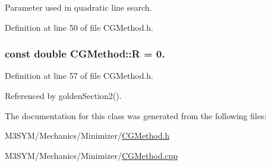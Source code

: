 Parameter used in quadratic line search. 



Definition at line 50 of file C\+G\+Method.\+h.

\hypertarget{classCGMethod_a2e7906b4b29a1b76dca43d56eaf2efac}{
\subsubsection[{R}]{\setlength{\rightskip}{0pt plus 5cm}const double C\+G\+Method\+::\+R = 0.\hspace{0.3cm}{\ttfamily [protected]}}}\label{classCGMethod_a2e7906b4b29a1b76dca43d56eaf2efac}


Definition at line 57 of file C\+G\+Method.\+h.



Referenced by golden\+Section2().



The documentation for this class was generated from the following files\+:\begin{DoxyCompactItemize}
\item 
M3\+S\+Y\+M/\+Mechanics/\+Minimizer/\hyperlink{CGMethod_8h}{C\+G\+Method.\+h}\item 
M3\+S\+Y\+M/\+Mechanics/\+Minimizer/\hyperlink{CGMethod_8cpp}{C\+G\+Method.\+cpp}\end{DoxyCompactItemize}
